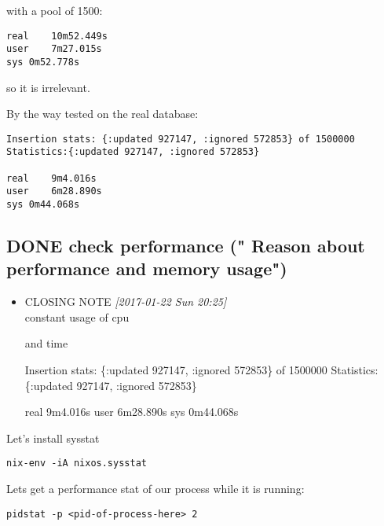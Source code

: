 \documentclass[11pt]{article}
\begin{document}
with a pool of 1500:

\begin{verbatim}
real	10m52.449s
user	7m27.015s
sys	0m52.778s
\end{verbatim}

so it is irrelevant.

By the way tested on the real database:
\begin{verbatim}
Insertion stats: {:updated 927147, :ignored 572853} of 1500000
Statistics:{:updated 927147, :ignored 572853}

real	9m4.016s
user	6m28.890s
sys	0m44.068s
\end{verbatim}
\subsection{{\bfseries\sffamily DONE} check performance (" Reason about performance and memory usage")}
\label{sec:orgaf86624}
\begin{itemize}
\item CLOSING NOTE \textit{[2017-01-22 Sun 20:25] } \\
constant usage of cpu

and time

Insertion stats: \{:updated 927147, :ignored 572853\} of 1500000
Statistics:\{:updated 927147, :ignored 572853\}

real	9m4.016s
user	6m28.890s
sys	0m44.068s
\end{itemize}
Let's install sysstat

\begin{verbatim}
nix-env -iA nixos.sysstat
\end{verbatim}

Lets get a performance stat of our process while it is running:
\begin{verbatim}
pidstat -p <pid-of-process-here> 2
\end{verbatim}
\end{document}

